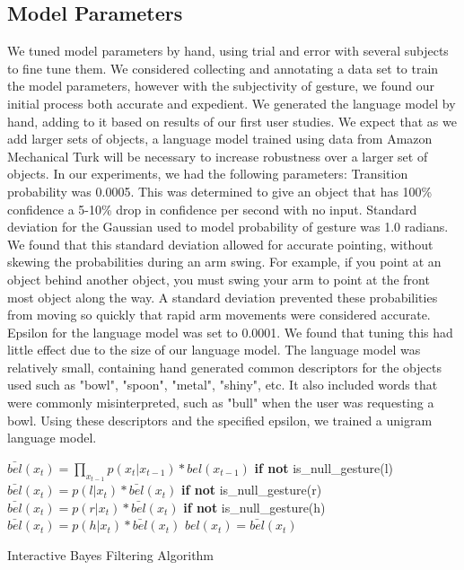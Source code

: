\documentclass[letterpaper, 10 pt, conference]{ieeeconf}
\begin{document}
\subsection{Model Parameters}
We tuned model parameters by hand, using trial and error with several
subjects to fine tune them.  We considered collecting and annotating a
data set to train the model parameters, however with the subjectivity
of gesture, we found our initial process both accurate and
expedient. We generated the language model by hand, adding to it based
on results of our first user studies.  We expect that as we add larger
sets of objects, a language model trained using data from Amazon
Mechanical Turk will be necessary to increase robustness over a larger
set of objects.
In our experiments, we had the following parameters:
Transition probability was 0.0005. This was determined to give an  object that has 100\% confidence a 5-10\% drop in confidence per second with no input.
Standard deviation for the Gaussian used to model probability of gesture was 1.0 radians. We found that this standard deviation allowed for accurate pointing, without skewing the probabilities during an arm swing. For example, if you point at an object behind another object, you must swing your arm to point at the front most object along the way. A standard deviation prevented these probabilities from moving so quickly that rapid arm movements were considered accurate. Epsilon for the language model was set to 0.0001. We found that tuning this had little effect due to the size of our language model. The language model was relatively small, containing hand generated common descriptors for the objects used such as "bowl", "spoon", "metal", "shiny", etc. It also included words that were commonly misinterpreted, such as "bull" when the user was requesting a bowl. Using these descriptors and the specified epsilon, we trained a unigram language model.

\begin{algorithm}
    \DontPrintSemicolon
    \BlankLine
    \BlankLine
     {
      $\bar{bel}(x_t) = \displaystyle\prod_{x_{t-1}} p(x_t|x_{t-1})*bel(x_{t-1})$
      \BlankLine
      \textbf{if not} is\_null\_gesture(l)
      \BlankLine
      \Indp$\bar{bel}(x_t) = p(l | x_t) *  \bar{bel}(x_t)$
      \BlankLine
      \Indm\textbf{if not} is\_null\_gesture(r)
      \BlankLine
      \Indp$\bar{bel}(x_t) = p(r | x_t) *  \bar{bel}(x_t)$
      \BlankLine
      \Indm\textbf{if not} is\_null\_gesture(h)
      \BlankLine
      \Indp$\bar{bel}(x_t) = p(h | x_t) *  \bar{bel}(x_t)$
      \BlankLine
      \Indm{}
      $bel(x_t) = \bar{bel}(x_t)$

    }
    \BlankLine
\caption{Interactive Bayes Filtering Algorithm} 
\label{alg:algorithm}
\end{algorithm}
\end{document}
